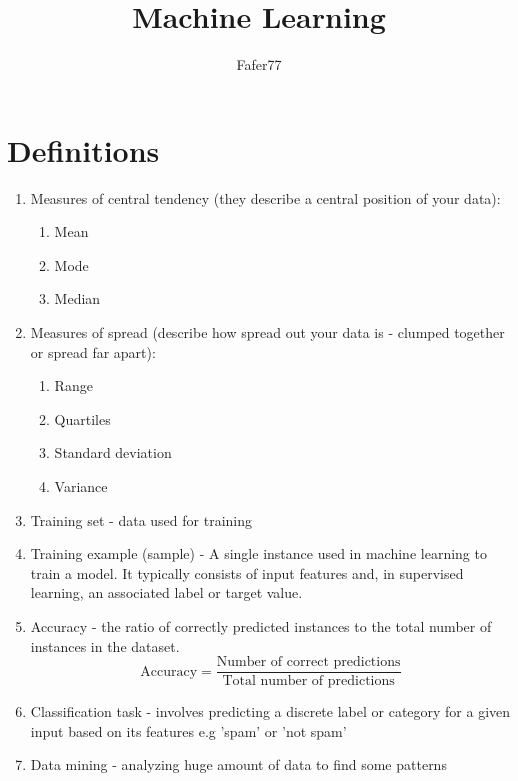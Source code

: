 \documentclass[english,12pt,a4paper]{article}
\title{Machine Learning}
\author{Fafer77}
\begin{document}
	\maketitle
	\section{Definitions}
	\begin{enumerate}
		\item Measures of central tendency (they describe a central position of your data):
		\begin{enumerate}
			\item Mean
			\item Mode
			\item Median
		\end{enumerate}
		\item Measures of spread (describe how spread out your data is - clumped together or spread far apart):
		\begin{enumerate}
			\item Range
			\item Quartiles
			\item Standard deviation
			\item Variance
		\end{enumerate}
		\item Training set - data used for training
		\item Training example (sample) - A single instance used in machine learning to train a model. It typically consists of input features and, in supervised learning, an associated label or target value.
		\item Accuracy - the ratio of correctly predicted instances to the total number of instances in the dataset. 
		\[
		\text{Accuracy} = \frac{\text{Number of correct predictions}}{\text{Total number of predictions}}
		\]
		\item Classification task - involves predicting a discrete label or category for a given input based on its features e.g 'spam' or 'not spam'
		\item Data mining - analyzing huge amount of data to find some patterns
	\end{enumerate}
\end{document}
